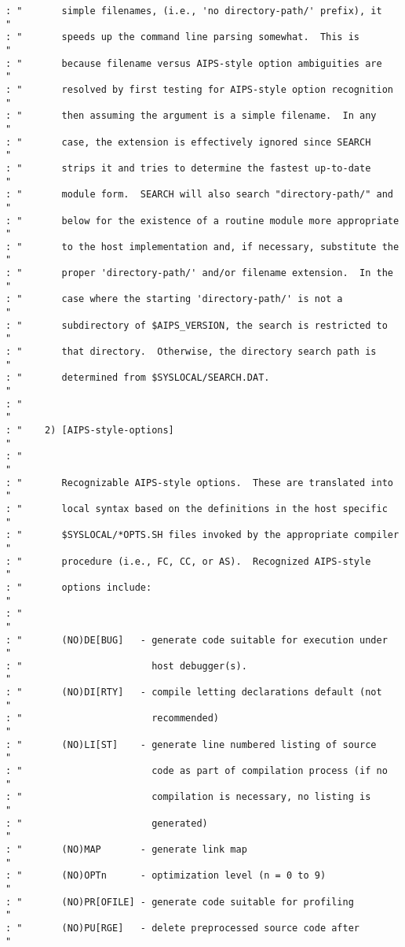 \begin{verbatim}
: "       simple filenames, (i.e., 'no directory-path/' prefix), it    "
: "       speeds up the command line parsing somewhat.  This is        "
: "       because filename versus AIPS-style option ambiguities are    "
: "       resolved by first testing for AIPS-style option recognition  "
: "       then assuming the argument is a simple filename.  In any     "
: "       case, the extension is effectively ignored since SEARCH      "
: "       strips it and tries to determine the fastest up-to-date      "
: "       module form.  SEARCH will also search "directory-path/" and  "
: "       below for the existence of a routine module more appropriate "
: "       to the host implementation and, if necessary, substitute the "
: "       proper 'directory-path/' and/or filename extension.  In the  "
: "       case where the starting 'directory-path/' is not a           "
: "       subdirectory of $AIPS_VERSION, the search is restricted to   "
: "       that directory.  Otherwise, the directory search path is     "
: "       determined from $SYSLOCAL/SEARCH.DAT.                        "
: "                                                                    "
: "    2) [AIPS-style-options]                                         "
: "                                                                    "
: "       Recognizable AIPS-style options.  These are translated into  "
: "       local syntax based on the definitions in the host specific   "
: "       $SYSLOCAL/*OPTS.SH files invoked by the appropriate compiler "
: "       procedure (i.e., FC, CC, or AS).  Recognized AIPS-style      "
: "       options include:                                             "
: "                                                                    "
: "       (NO)DE[BUG]   - generate code suitable for execution under   "
: "                       host debugger(s).                            "
: "       (NO)DI[RTY]   - compile letting declarations default (not    "
: "                       recommended)                                 "
: "       (NO)LI[ST]    - generate line numbered listing of source     "
: "                       code as part of compilation process (if no   "
: "                       compilation is necessary, no listing is      "
: "                       generated)                                   "
: "       (NO)MAP       - generate link map                            "
: "       (NO)OPTn      - optimization level (n = 0 to 9)              "
: "       (NO)PR[OFILE] - generate code suitable for profiling         "
: "       (NO)PU[RGE]   - delete preprocessed source code after        "

\end{verbatim}
